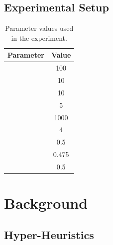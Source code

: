 \documentclass[a4paper,12pt]{article}
\begin{document}
    \subsection{Experimental Setup}
        \par{
            \begin{table}[ht]
                \centering
                    \small 
                    \begin{tabular}{ | c | c | }

                        \hline
                        \textbf{Parameter} & \textbf{Value} \\
                        \hline  
                        \nameref{subsubsec:mg} & 100 \\
                        \hline 
                        \nameref{subsubsec:kf} & 10 \\
                        \hline 
                        \nameref{subsubsec:mmd} & 10 \\
                        \hline 
                        \nameref{subsubsec:cmd} & 5 \\
                        \hline 
                        \nameref{subsubsec:ps} & 1000 \\
                        \hline 
                        \nameref{subsubsec:ts} & 4 \\
                        \hline 
                        \nameref{subsubsec:car} & 0.5 \\
                        \hline 
                        \nameref{subsubsec:mar} & 0.475 \\
                        \hline 
                        \nameref{subsubsec:har} & 0.5 \\
                        \hline 
                    \end{tabular}
                    \caption{Parameter values used in the experiment.} 
            \end{table} 
        }
       
\section{Background} \label{sec:background} 
    \subsection{Hyper-Heuristics}
\end{document}
